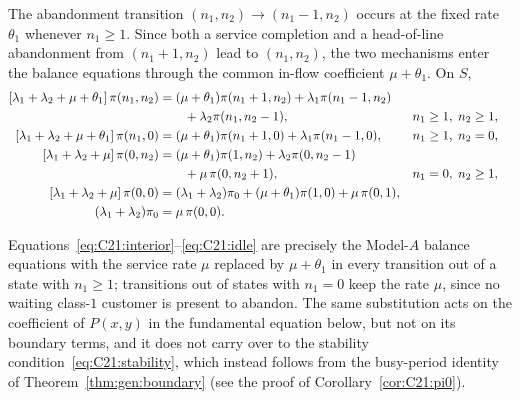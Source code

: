 The abandonment transition $(n_1,n_2)\to(n_1-1,n_2)$ occurs at the fixed rate $\theta_1$ whenever $n_1\ge1$. Since both a service completion and a head-of-line abandonment from $(n_1+1,n_2)$ lead to $(n_1,n_2)$, the two mechanisms enter the balance equations through the common in-flow coefficient $\mu+\theta_1$. On $S$,
\begin{align}
    \left[\lambda_1+\lambda_2+\mu+\theta_1\right]\pi(n_1,n_2)
    &= (\mu+\theta_1)\pi(n_1+1,n_2)
      +\lambda_1\pi(n_1-1,n_2) \notag\\
    &\qquad
      +\lambda_2\pi(n_1,n_2-1),
    &&n_1\ge1,\;n_2\ge1, \label{eq:C21:interior} \\
    \left[\lambda_1+\lambda_2+\mu+\theta_1\right]\pi(n_1,0)
    &= (\mu+\theta_1)\pi(n_1+1,0)
      +\lambda_1\pi(n_1-1,0),
    &&n_1\ge1,\;n_2=0, \nonumber \\
    \left[\lambda_1+\lambda_2+\mu\right]\pi(0,n_2)
    &= (\mu+\theta_1)\pi(1,n_2)
      +\lambda_2\pi(0,n_2-1) \notag\\
    &\qquad
      +\mu\,\pi(0,n_2+1),
    &&n_1=0,\;n_2\ge1, \nonumber \\
    \left[\lambda_1+\lambda_2+\mu\right]\pi(0,0)
    &= (\lambda_1+\lambda_2)\pi_0
      + (\mu+\theta_1)\pi(1,0)
      + \mu\,\pi(0,1),
    &&\nonumber \\
    (\lambda_1+\lambda_2)\pi_0
    &= \mu\,\pi(0,0).
    &&\label{eq:C21:idle}
\end{align}

\begin{remark}\label{rem:C21:mushift}
Equations~\eqref{eq:C21:interior}--\eqref{eq:C21:idle} are precisely the Model-$A$ balance equations with the service rate $\mu$ replaced by $\mu+\theta_1$ in every transition out of a state with $n_1\ge1$; transitions out of states with $n_1=0$ keep the rate $\mu$, since no waiting class-$1$ customer is present to abandon. The same substitution acts on the coefficient of $P(x,y)$ in the fundamental equation below, but not on its boundary terms, and it does not carry over to the stability condition~\eqref{eq:C21:stability}, which instead follows from the busy-period identity of Theorem~\ref{thm:gen:boundary} (see the proof of Corollary~\ref{cor:C21:pi0}).
\end{remark}

